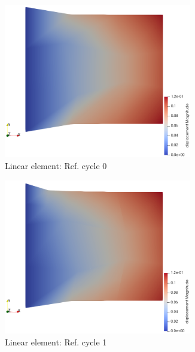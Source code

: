 \documentclass[11pt,a4paper,final]{article}
\begin{document}
\begin{figure}[h]
\centering
\begin{subfigure}[b]{0.35\textwidth}
\centering
\includegraphics[width=0.9\textwidth]{patch_distort_grid_ref_0.png}
\caption{Linear element: Ref. cycle 0}
\label{fig:1.2.1}
\end{subfigure}
\begin{subfigure}[b]{0.35\textwidth}
\centering
\includegraphics[width=0.9\textwidth]{patch_distort_grid_ref_1.png}
\caption{Linear element: Ref. cycle 1}
\label{fig:1.2.2}
\end{subfigure}
\begin{subfigure}[b]{0.35\textwidth}
\centering

\end{subfigure}
\end{figure}
\end{document}
